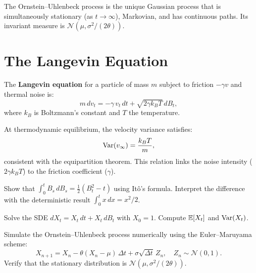 \begin{remark}
The Ornstein--Uhlenbeck process is the unique Gaussian process that is
simultaneously stationary (as $t \to \infty$), Markovian, and has
continuous paths. Its invariant measure is
$\mathcal{N}(\mu, \sigma^2/(2\theta))$.
\end{remark}

\section{The Langevin Equation}
\label{sec:langevin}

\begin{definition}
The \textbf{Langevin equation} for a particle of mass $m$ subject to
friction $-\gamma v$ and thermal noise is:
\[
  m\,dv_t = -\gamma\,v_t\,dt + \sqrt{2\gamma k_B T}\,dB_t,
\]
where $k_B$ is Boltzmann's constant and $T$ the temperature.
\end{definition}

\begin{proposition}
At thermodynamic equilibrium, the velocity variance satisfies:
\[
  \mathrm{Var}(v_\infty) = \frac{k_B T}{m},
\]
consistent with the equipartition theorem. This relation links the
noise intensity ($2\gamma k_B T$) to the friction coefficient ($\gamma$).
\end{proposition}

\begin{exercise}
Show that $\int_0^t B_s\,dB_s = \frac{1}{2}(B_t^2 - t)$ using It\^o's
formula. Interpret the difference with the deterministic result
$\int_0^t x\,dx = x^2/2$.
\end{exercise}

\begin{exercise}
Solve the SDE $dX_t = X_t\,dt + X_t\,dB_t$ with $X_0 = 1$.
Compute $\mathbb{E}[X_t]$ and $\mathrm{Var}(X_t)$.
\end{exercise}

\begin{exercise}
Simulate the Ornstein--Uhlenbeck process numerically using the
Euler--Maruyama scheme:
\[
  X_{n+1} = X_n - \theta(X_n - \mu)\,\Delta t
    + \sigma\sqrt{\Delta t}\,Z_n, \quad Z_n \sim \mathcal{N}(0,1).
\]
Verify that the stationary distribution is
$\mathcal{N}(\mu, \sigma^2/(2\theta))$.
\end{exercise}

